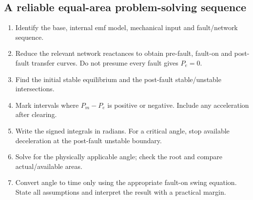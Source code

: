 \documentclass[11pt,a4paper]{article}
\begin{document}
\subsection{A reliable equal-area problem-solving sequence}
\begin{enumerate}
\item Identify the base, internal emf model, mechanical input and fault/network sequence.
\item Reduce the relevant network reactances to obtain pre-fault, fault-on and post-fault transfer curves. Do not presume every fault gives $P_e=0$.
\item Find the initial stable equilibrium and the post-fault stable/unstable intersections.
\item Mark intervals where $P_m-P_e$ is positive or negative. Include any acceleration after clearing.
\item Write the signed integrals in radians. For a critical angle, stop available deceleration at the post-fault unstable boundary.
\item Solve for the physically applicable angle; check the root and compare actual/available areas.
\item Convert angle to time only using the appropriate fault-on swing equation. State all assumptions and interpret the result with a practical margin.
\end{enumerate}
\end{document}
